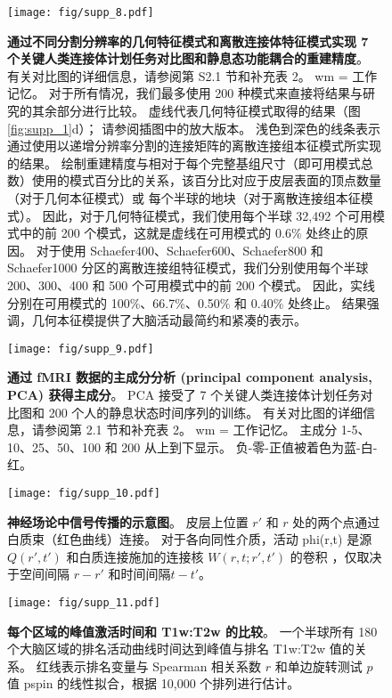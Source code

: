 \documentclass[lang=cn,a4paper,newtx]{elegantpaper}
\begin{document}
\begin{figure}[!htb] 
	\centering
	\texttt{[image: fig/supp\_8.pdf]}
	\caption{
	\textbf{通过不同分割分辨率的几何特征模式和离散连接体特征模式实现 7 个关键人类连接体计划任务对比图和静息态功能耦合的重建精度}。
	有关对比图的详细信息，请参阅第 S2.1 节和补充表 2。 wm = 工作记忆。
	对于所有情况，我们最多使用 200 种模式来直接将结果与研究的其余部分进行比较。
	虚线代表几何特征模式取得的结果（图\ref{fig:supp_1}d）；
	请参阅插图中的放大版本。
	浅色到深色的线条表示通过使用以递增分辨率分割的连接矩阵的离散连接组本征模式所实现的结果。
	绘制重建精度与相对于每个完整基组尺寸（即可用模式总数）使用的模式百分比的关系，该百分比对应于皮层表面的顶点数量（对于几何本征模式）或 每个半球的地块（对于离散连接组本征模式）。
	因此，对于几何特征模式，我们使用每个半球 32,492 个可用模式中的前 200 个模式，这就是虚线在可用模式的 0.6\% 处终止的原因。
	对于使用 Schaefer400、Schaefer600、Schaefer800 和 Schaefer1000 分区的离散连接组特征模式，我们分别使用每个半球 200、300、400 和 500 个可用模式中的前 200 个模式。
	因此，实线分别在可用模式的 100\%、66.7\%、0.50\% 和 0.40\% 处终止。
	结果强调，几何本征模提供了大脑活动最简约和紧凑的表示。
	} \label{fig:supp_8}
\end{figure}



\begin{figure}[!htb] 
	\centering
	\texttt{[image: fig/supp\_9.pdf]}
	\caption{
		\textbf{通过 fMRI 数据的主成分分析 (principal component analysis, PCA) 获得主成分}。
		PCA 接受了 7 个关键人类连接体计划任务对比图和 200 个人的静息状态时间序列的训练。
		有关对比图的详细信息，请参阅第 2.1 节和补充表 2。
		wm = 工作记忆。
		主成分 1-5、10、25、50、100 和 200 从上到下显示。
		负-零-正值被着色为蓝-白-红。
	} \label{fig:supp_9}
\end{figure}


\begin{figure}[!htb] 
	\centering
	\texttt{[image: fig/supp\_10.pdf]}
	\caption{\textbf{神经场论中信号传播的示意图}。
		皮层上位置 $ r' $ 和 $ r $ 处的两个点通过白质束（红色曲线）连接。 对于各向同性介质，活动 phi(r,t) 是源 $ Q(r',t') $ 和白质连接施加的连接核 $ W(r,t;r',t') $ 的卷积 ，仅取决于空间间隔 $ r-r' $ 和时间间隔$  t-t' $。
	} \label{fig:supp_10}
\end{figure}


\begin{figure}[!htb] 
	\centering
	\texttt{[image: fig/supp\_11.pdf]}
	\caption{
		\textbf{每个区域的峰值激活时间和 T1w:T2w 的比较}。
		一个半球所有 180 个大脑区域的排名活动曲线时间达到峰值与排名 T1w:T2w 值的关系。
		红线表示排名变量与 Spearman 相关系数 $ r $ 和单边旋转测试 $ p $ 值 pspin 的线性拟合，根据 10,000 个排列进行估计。
	} \label{fig:supp_11}
\end{figure}














\nocite{*}
\printbibliography[heading=bibintoc, title=\ebibname]

\appendix
\addappheadtotoc
\end{document}
